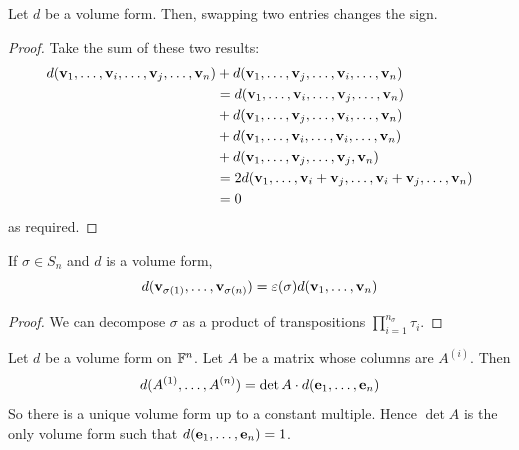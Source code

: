 \documentclass[a4paper,11pt]{article}
\begin{document}
\begin{lemma}
	Let $ d $ be a volume form.
	Then, swapping two entries changes the sign.
\end{lemma}
\begin{proof}
	Take the sum of these two results:
	\begin{align*}
		d({\bf v}_1, \dots, {\bf v}_i, \dots, {\bf v}_j, \dots, {\bf v}_n) & + d({\bf v}_1, \dots, {\bf v}_j, \dots, {\bf v}_i, \dots, {\bf v}_n)               \\
		                                           & = d({\bf v}_1, \dots, {\bf v}_i, \dots, {\bf v}_j, \dots, {\bf v}_n)               \\
		                                           & + d({\bf v}_1, \dots, {\bf v}_j, \dots, {\bf v}_i, \dots, {\bf v}_n)               \\
		                                           & + d({\bf v}_1, \dots, {\bf v}_i, \dots, {\bf v}_i, \dots, {\bf v}_n)               \\
		                                           & + d({\bf v}_1, \dots, {\bf v}_j, \dots, {\bf v}_j, {\bf v}_n)                      \\
		                                           & = 2 d({\bf v}_1, \dots, {\bf v}_i + {\bf v}_j, \dots, {\bf v}_i + {\bf v}_j, \dots, {\bf v}_n) \\
		                                           & = 0
	\end{align*}
	as required.
\end{proof}

\begin{corollary}
	If $ \sigma \in S_n $ and $ d $ is a volume form,
	\[
		d({\bf v}_{\sigma(1)}, \dots, {\bf v}_{\sigma(n)}) = \varepsilon(\sigma) d({\bf v}_1, \dots, {\bf v}_n)
	\]
\end{corollary}
\begin{proof}
	We can decompose $ \sigma $ as a product of transpositions $ \prod_{i=1}^{n_\sigma} \tau_i $.
\end{proof}

\begin{theorem}
	Let $ d $ be a volume form on $ {\mathbb{F}}^n $.
	Let $ A $ be a matrix whose columns are $ A^{(i)} $.
	Then
	\[
		d(A^{(1)}, \dots, A^{(n)}) = \det A \cdot d({\bf e}_1, \dots, {\bf e}_n)
	\]
	So there is a unique volume form up to a constant multiple.
	Hence $ \det A $ is the only volume form such that $ d({\bf e}_1, \dots, {\bf e}_n) = 1 $.
\end{theorem}
\end{document}
